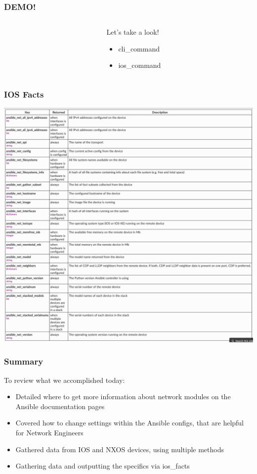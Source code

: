 \documentclass{beamer}
\begin{document}
\begin{frame}
  \frametitle{DEMO!}
  \begin{columns}
  \begin{column}{0.3\textwidth}
    \Huge
    \begin{center}
      \faDesktop 
      \hspace{.5cm}
      \faRocket     
    \end{center}
  \end{column}
  \begin{column}{0.7\textwidth}
    \huge 
    Let's take a look!
    \begin{itemize}
      \item cli\_command
      \item ios\_command
    \end{itemize}
  \end{column}
\end{columns}
\end{frame}

\begin{frame}
  \frametitle{IOS Facts}
  \includegraphics[width=\textwidth]{assets/ios_facts.png}
  

\end{frame}


\begin{frame}
  \frametitle{Summary}
    To review what we accomplished today:
    \begin{itemize}
      \item <1-> Detailed where to get more information about network modules on the Ansible documentation pages
      \item <2-> Covered how to change settings within the Ansible configs, that are helpful for Network Engineers
      \item <3-> Gathered data from IOS and NXOS devices, using multiple methods
      \item <4-> Gathering data and outputting the specifics via ios\_facts
    \end{itemize}
\end{frame}
\end{document}
